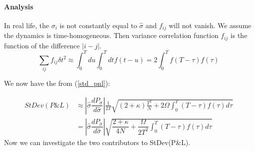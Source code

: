 \documentclass[a4]{article}
\begin{document}
\paragraph{Analysis}
In real life, the $\sigma_{i}$ is not constantly equal to $\hat{\sigma}$ and $f_{ij}$ will not vanish. We assume the dynamics is time-homogeneous. Then variance correlation function $f_{ij}$ is the function of the difference $|i-j|$.
\begin{equation}
\sum_{ij}f_{ij}\delta t^{2}\approx \int^{T}_{0}du\int^{T}_{0}dtf(t-u) = 2\int^{T}_{0}f(T-\tau)f(\tau)
\end{equation}\par 
We now have the from (\ref{std_pnl}):\par 
\begin{equation}
\label{real_std_pnl}
\begin{aligned}
StDev(P\&L)&\approx |\hat{\sigma}\dfrac{dP_{\hat{\sigma}}}{d\hat{\sigma}}|\frac{1}{2T}\sqrt{(2+\kappa)\frac{T^{2}}{N}+2\Omega\int^{T}_{0}(T-\tau)f(\tau)d\tau}\\
&=|\hat{\sigma}\dfrac{dP_{\hat{\sigma}}}{d\hat{\sigma}}|\sqrt{\dfrac{2+\kappa}{4N}+\dfrac{\Omega}{2T^{2}}\int^{T}_{0}(T-\tau)f(\tau)d\tau}
\end{aligned}
\end{equation}
\bigbreak 
\noindent Now we can investigate the two contributors to StDev(P\&L).\par 
\end{document}
